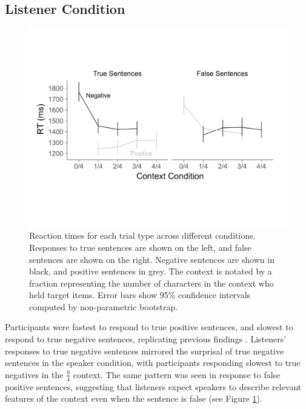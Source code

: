 \documentclass[man, noapacite]{apa2}
\begin{document}
\subsection{Listener Condition}

\begin{figure}[t]
\begin{center} 
\includegraphics[width=6in]{figures/rts_mod2.pdf}
\caption{\label{fig:listenerrt} Reaction times for each trial type across different conditions. Responses to true sentences are shown on the left, and false sentences are shown on the right.  Negative sentences are shown in black, and positive sentences in grey.  The context is notated by a fraction representing the number of characters in the context who held target items. Error bars show 95\% confidence intervals computed by non-parametric bootstrap.}
\end{center} 
\end{figure}

Participants were fastest to respond to true positive sentences, and slowest to respond to true negative sentences, replicating previous findings \cite{hclark1972}.  Listeners' responses to true negative sentences mirrored the surprisal of true negative sentences in the speaker condition, with participants responding slowest to true negatives in the $\frac{0}{4}$ context.  The same pattern was seen in response to false positive sentences, suggesting that listeners expect speakers to describe relevant features of the context even when the sentence is false (see Figure \ref{fig:listenerrt}).  
\end{document}
